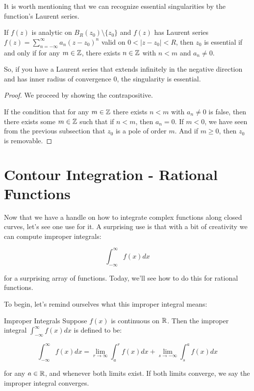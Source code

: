 It is worth mentioning that we can recognize essential singularities by the function's Laurent series.

\begin{thmbo}{}{} If $f(z)$ is analytic on $B_R(z_0)\setminus\{z_0\}$ and $f(z)$ has Laurent series $f(z) = \sum_{n = -\infty}^\infty a_n(z-z_0)^n$ valid on $0 < |z-z_0| < R$, then $z_0$ is essential if and only if for any $m\in \mathbb{Z}$, there exists $n\in \mathbb{Z}$ with $n < m$ and $a_n \ne 0$.
\end{thmbo}

So, if you have a Laurent series that extends infinitely in the negative direction and has inner radius of convergence $0$, the singularity is essential.

\begin{proof} We proceed by showing the contrapositive.

If the condition that for any $m\in\mathbb{Z}$ there exists $n< m$ with $a_n \ne 0$ is false, then there exists some $m \in \mathbb{Z}$ such that if $n < m$, then $a_n = 0$. If $m < 0$, we have seen from the previous subsection that $z_0$ is a pole of order $m$. And if $m\ge 0$, then $z_0$ is removable.
\end{proof}

\section{Contour Integration - Rational Functions}

Now that we have a handle on how to integrate complex functions along closed curves, let's see one use for it. A surprising use is that with a bit of creativity we can compute improper integrals:

$$\int_{-\infty}^\infty f(x)dx$$

\noin for a surprising array of functions. Today, we'll see how to do this for rational functions.

To begin, let's remind ourselves what this improper integral means:

\begin{defbo}{Improper Integrals}{} Suppose $f(x)$ is continuous on $\mathbb{R}$. Then the improper integral $\int_{-\infty}^\infty f(x)dx$ is defined to be:

$$\int_{-\infty}^\infty f(x)dx = \lim_{r\rightarrow \infty} \int_{a}^r f(x)dx + \lim_{s\rightarrow -\infty} \int_s^a f(x)dx$$

\noin for any $a\in \mathbb{R}$, and whenever both limits exist. If both limits converge, we say the improper integral converges.\end{defbo}

